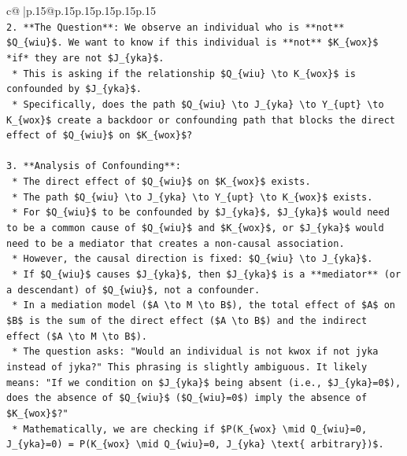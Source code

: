 \documentclass{article}
\begin{document}
{\begin{supertabular}{c@{$\;$}|p{.15\linewidth}@{}p{.15\linewidth}p{.15\linewidth}p{.15\linewidth}p{.15\linewidth}p{.15\linewidth}}
{{{\\ 
\texttt{2.  **The Question**: We observe an individual who is **not** \$Q\_\{wiu\}\$. We want to know if this individual is **not** \$K\_\{wox\}\$ *if* they are not \$J\_\{yka\}\$.} \\
\texttt{    *   This is asking if the relationship \$Q\_\{wiu\} \textbackslash{}to K\_\{wox\}\$ is confounded by \$J\_\{yka\}\$.} \\
\texttt{    *   Specifically, does the path \$Q\_\{wiu\} \textbackslash{}to J\_\{yka\} \textbackslash{}to Y\_\{upt\} \textbackslash{}to K\_\{wox\}\$ create a backdoor or confounding path that blocks the direct effect of \$Q\_\{wiu\}\$ on \$K\_\{wox\}\$?} \\
\\ 
\texttt{3.  **Analysis of Confounding**:} \\
\texttt{    *   The direct effect of \$Q\_\{wiu\}\$ on \$K\_\{wox\}\$ exists.} \\
\texttt{    *   The path \$Q\_\{wiu\} \textbackslash{}to J\_\{yka\} \textbackslash{}to Y\_\{upt\} \textbackslash{}to K\_\{wox\}\$ exists.} \\
\texttt{    *   For \$Q\_\{wiu\}\$ to be confounded by \$J\_\{yka\}\$, \$J\_\{yka\}\$ would need to be a common cause of \$Q\_\{wiu\}\$ and \$K\_\{wox\}\$, or \$J\_\{yka\}\$ would need to be a mediator that creates a non{-}causal association.} \\
\texttt{    *   However, the causal direction is fixed: \$Q\_\{wiu\} \textbackslash{}to J\_\{yka\}\$.} \\
\texttt{    *   If \$Q\_\{wiu\}\$ causes \$J\_\{yka\}\$, then \$J\_\{yka\}\$ is a **mediator** (or a descendant) of \$Q\_\{wiu\}\$, not a confounder.} \\
\texttt{    *   In a mediation model (\$A \textbackslash{}to M \textbackslash{}to B\$), the total effect of \$A\$ on \$B\$ is the sum of the direct effect (\$A \textbackslash{}to B\$) and the indirect effect (\$A \textbackslash{}to M \textbackslash{}to B\$).} \\
\texttt{    *   The question asks: "Would an individual is not kwox if not jyka instead of jyka?" This phrasing is slightly ambiguous. It likely means: "If we condition on \$J\_\{yka\}\$ being absent (i.e., \$J\_\{yka\}=0\$), does the absence of \$Q\_\{wiu\}\$ (\$Q\_\{wiu\}=0\$) imply the absence of \$K\_\{wox\}\$?"} \\
\texttt{    *   Mathematically, we are checking if \$P(K\_\{wox\} \textbackslash{}mid Q\_\{wiu\}=0, J\_\{yka\}=0) = P(K\_\{wox\} \textbackslash{}mid Q\_\{wiu\}=0, J\_\{yka\} \textbackslash{}text\{ arbitrary\})\$.} \\
}}}
\end{supertabular}}
\end{document}
